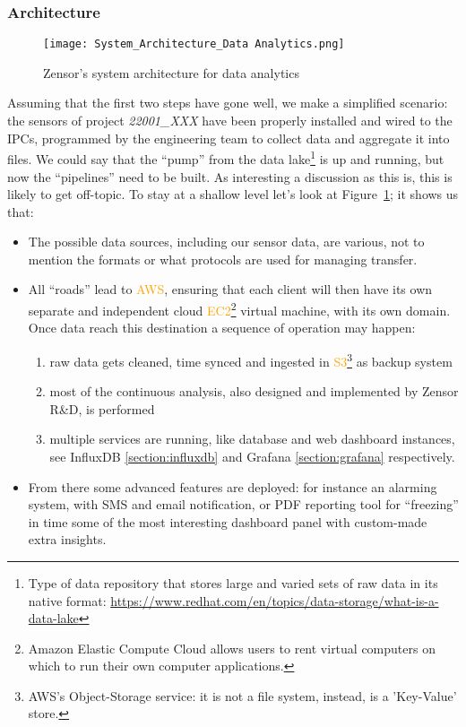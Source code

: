 \subsubsection{Architecture}
\begin{figure}[ht]
    \centering
    \texttt{[image: System\_Architecture\_Data Analytics.png]}
    \caption{Zensor's system architecture for data analytics}
    \label{fig:zensor_sys_architecture}
\end{figure}
Assuming that the first two steps have gone well, we make a simplified scenario: the sensors of project \textit{22001\_XXX} have been properly installed and wired to the \acs{IPCs}, programmed by the engineering team to collect data and aggregate it into files. 
We could say that the ``pump'' from the data lake\footnote{Type of data repository that stores large and varied sets of raw data in its native format: \url{https://www.redhat.com/en/topics/data-storage/what-is-a-data-lake}} is up and running, but now the ``pipelines'' 
need to be built. As interesting a discussion as this is, this is likely to get off-topic. To stay at a shallow level let's look at Figure~\ref{fig:zensor_sys_architecture}; it shows us that:
\begin{itemize}
	\item The possible data sources, including our sensor data, are various, not to mention the formats or what protocols are used for managing transfer. 
	\item All ``roads'' lead to \textcolor{orange}{\ac{AWS}}, ensuring that each client will then have its own separate and independent cloud \textcolor{orange}{EC2}\footnote{Amazon Elastic Compute Cloud allows users to rent virtual computers on which to run their own computer applications.} 
	virtual machine, with its own domain.
		Once data reach this destination a sequence of operation may happen:\begin{enumerate}
		\item raw data gets cleaned, time synced and ingested in \textcolor{orange}{\ac{S3}}\footnote{AWS's Object-Storage service: it is not a file system, instead, is a 'Key-Value' store.} as backup system
		\item most of the continuous analysis, also designed and implemented by Zensor R\&D, is performed
		\item multiple services are running, like database and web dashboard instances, see InfluxDB \ref{section:influxdb} and Grafana \ref{section:grafana} respectively.
	\end{enumerate} 
	\item From there some advanced features are deployed: for instance an alarming system, with SMS and email notification, 
		or PDF reporting tool for ``freezing'' in time some of the most interesting dashboard panel with custom-made extra insights. %
\end{itemize}

